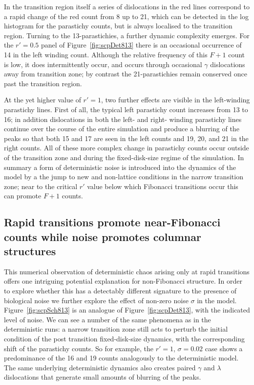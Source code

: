 \documentclass[a4paper,10pt]{amsart}
\begin{document}
  In the transition region itself a series of dislocations in the red lines correspond to a rapid change of the red count from 8 up to 21, which can be detected in the 
 log histogram for the parastichy counts, but is always localised to the transition region. Turning to the 13-parastichies,  a further dynamic complexity emerges.
 For the  $r'=0.5$ panel of  Figure~\ref{fig:scpDet813} there is an occasional occurrence of 14 in the left winding count. Although the relative frequency of this $F+1$ count is low, it does intermittently occur, and occurs through occasional $\gamma$ dislocations away from  transition zone; by contrast the 21-parastichies remain conserved once past the transition region. 
 
At the yet higher value of $r'=1$, two further effects are visible in the left-winding parastichy lines. First of all,  the typical left parastichy count increases from 13 to 16; in addition dislocations in both the left- and right- winding parastichy lines continue over the  course of the entire simulation and produce a blurring of the peaks so that both 15 and 17 are seen in the left counts and 19, 20, and 21 in the right counts. All of these more complex change in parastichy counts occur outside of the transition zone and during the fixed-disk-size regime of the simulation.  In summary a form of deterministic noise is introduced into the dynamics of the model by a the jump to new and non-lattice conditions  in the narrow transition zone; near to the critical $r'$ value below which Fibonacci transitions occur this can promote $F+1$ counts.


\subsection{Rapid transitions promote near-Fibonacci counts while noise promotes columnar structures}
This numerical observation of deterministic chaos arising only at rapid transitions offers one intriguing potential explanation for non-Fibonacci structure. In order to explore whether this has a detectably different signature to the presence of biological noise we further explore the effect of non-zero noise $\sigma$ in the model.   
Figure~\ref{fig:scpSch813} is an analogue of Figure~\ref{fig:scpDet813},
 with the indicated level of noise.
We can see a number of the same phenomena as in the deterministic runs: a narrow transition zone still acts to perturb the initial condition of the post transition fixed-disk-size dynamics, with the corresponding shift of the parastichy counts. So for example, the $r'=1$, $\sigma=0.02$ case shows a predominance of the 16 and 19 counts analogously to the deterministic model. The same underlying deterministic dynamics also creates paired $\gamma$ and $\lambda$ dislocations that generate small amounts of blurring of the peaks.
 
\end{document}

